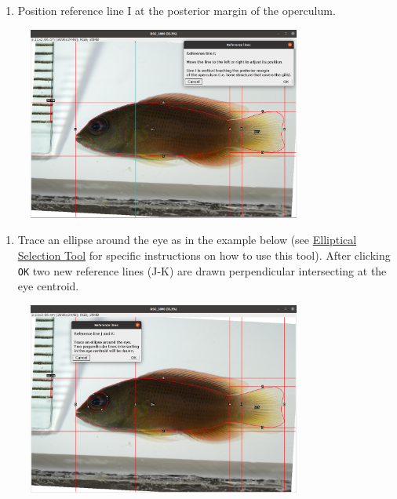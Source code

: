 \documentclass[
  letterpaper,
]{scrbook}
\providecommand{\tightlist}{%
  \setlength{\itemsep}{0pt}\setlength{\parskip}{0pt}}\usepackage{longtable,booktabs,array}
\begin{document}
\begin{enumerate}
\def\labelenumi{\arabic{enumi}.}
\setcounter{enumi}{6}
\tightlist
\item
  Position reference line I at the posterior margin of the operculum.
\end{enumerate}

\begin{figure}

{\centering \includegraphics[width=0.8\textwidth,height=\textheight]{./images/screenshots/ref_lineI.png}

}

\end{figure}

\begin{enumerate}
\def\labelenumi{\arabic{enumi}.}
\setcounter{enumi}{7}
\tightlist
\item
  Trace an ellipse around the eye as in the example below (see
  \href{https://imagej.nih.gov/ij/docs/guide/146-19.html}{Elliptical
  Selection Tool} for specific instructions on how to use this tool).
  After clicking \texttt{OK} two new reference lines (J-K) are drawn
  perpendicular intersecting at the eye centroid.
\end{enumerate}

\begin{figure}

{\centering \includegraphics[width=0.8\textwidth,height=\textheight]{./images/screenshots/eye_ellipse.png}

}

\end{figure}
\end{document}

